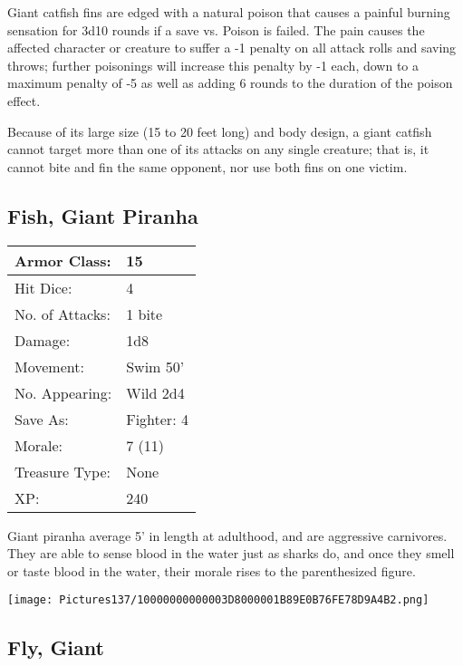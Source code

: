 \documentclass[a4paper,twoside,openany,10pt]{book}
\begin{document}
\begin{multicols}{2}
Giant catfish fins are edged with a natural poison that causes a painful burning sensation for 3d10 rounds if a save vs. Poison is failed. The pain causes the affected character or creature to suffer a -1 penalty on all attack rolls and saving throws; further poisonings will increase this penalty by -1 each, down to a maximum penalty of -5 as well as adding 6 rounds to the duration of the poison effect.

Because of its large size (15 to 20 feet long) and body design, a giant catfish cannot target more than one of its attacks on any single creature; that is, it cannot bite and fin the same opponent, nor use both fins on one victim.

\subsection*{Fish, Giant Piranha}\label{fish-giant-piranha}

\begin{tabularx}{0.48\textwidth}{@{}lX@{}}
Armor Class: & 15 \\\hline
Hit Dice: & 4 \\\hline
No. of Attacks: & 1 bite \\\hline
Damage: & 1d8 \\\hline
Movement: & Swim 50' \\\hline
No. Appearing: & Wild 2d4 \\\hline
Save As: & Fighter: 4 \\\hline
Morale: & 7 (11) \\\hline
Treasure Type: & None \\\hline
XP: & 240 \\\hline
\end{tabularx}\medskip


Giant piranha average 5' in length at adulthood, and are aggressive carnivores. They are able to sense blood in the water just as sharks do, and once they smell or taste blood in the water, their morale rises to the parenthesized figure.

\begin{center}
	\texttt{[image: Pictures137/10000000000003D8000001B89E0B76FE78D9A4B2.png]}
\end{center}

\subsection*{Fly, Giant}\label{fly-giant}


\end{multicols}
\end{document}

